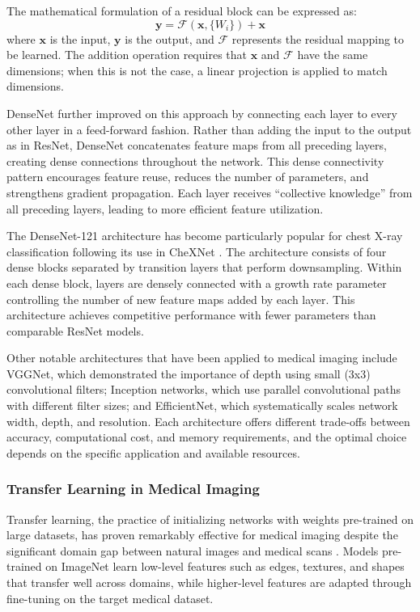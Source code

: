 \documentclass[12pt,a4paper]{article}
\begin{document}
The mathematical formulation of a residual block can be expressed as:
\begin{equation}
    \mathbf{y} = \mathcal{F}(\mathbf{x}, \{W_i\}) + \mathbf{x}
\end{equation}
where $\mathbf{x}$ is the input, $\mathbf{y}$ is the output, and $\mathcal{F}$ represents the residual mapping to be learned. The addition operation requires that $\mathbf{x}$ and $\mathcal{F}$ have the same dimensions; when this is not the case, a linear projection is applied to match dimensions.

DenseNet \cite{huang2017} further improved on this approach by connecting each layer to every other layer in a feed-forward fashion. Rather than adding the input to the output as in ResNet, DenseNet concatenates feature maps from all preceding layers, creating dense connections throughout the network. This dense connectivity pattern encourages feature reuse, reduces the number of parameters, and strengthens gradient propagation. Each layer receives ``collective knowledge'' from all preceding layers, leading to more efficient feature utilization.

The DenseNet-121 architecture has become particularly popular for chest X-ray classification following its use in CheXNet \cite{rajpurkar2017}. The architecture consists of four dense blocks separated by transition layers that perform downsampling. Within each dense block, layers are densely connected with a growth rate parameter controlling the number of new feature maps added by each layer. This architecture achieves competitive performance with fewer parameters than comparable ResNet models.

Other notable architectures that have been applied to medical imaging include VGGNet, which demonstrated the importance of depth using small (3x3) convolutional filters; Inception networks, which use parallel convolutional paths with different filter sizes; and EfficientNet, which systematically scales network width, depth, and resolution. Each architecture offers different trade-offs between accuracy, computational cost, and memory requirements, and the optimal choice depends on the specific application and available resources.

\subsubsection{Transfer Learning in Medical Imaging}

Transfer learning, the practice of initializing networks with weights pre-trained on large datasets, has proven remarkably effective for medical imaging despite the significant domain gap between natural images and medical scans \cite{raghu2019}. Models pre-trained on ImageNet learn low-level features such as edges, textures, and shapes that transfer well across domains, while higher-level features are adapted through fine-tuning on the target medical dataset.
\end{document}
